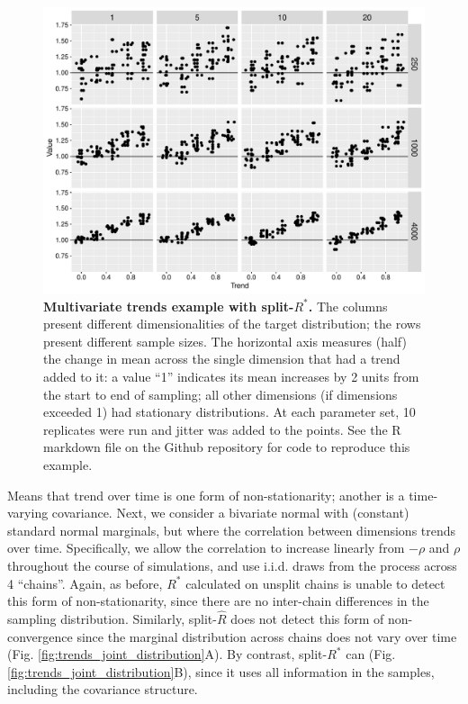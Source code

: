 \documentclass{article}
\begin{document}
\begin{figure}[!htb]
	\centerline{\includegraphics[width=1.0\textwidth]{../output/trends_one_dim.pdf}}
	\caption{\textbf{Multivariate trends example with split-$R^*$.} The columns present different dimensionalities of the target distribution; the rows present different sample sizes. The horizontal axis measures (half) the change in mean across the single dimension that had a trend added to it: a value ``1'' indicates its mean increases by 2 units from the start to end of sampling; all other dimensions (if dimensions exceeded 1) had stationary distributions. At each parameter set, 10 replicates were run and jitter was added to the points. See the R markdown file on the Github repository for code to reproduce this example.}
	\label{fig:trends_one_dim}
\end{figure}

Means that trend over time is one form of non-stationarity; another is a time-varying covariance. Next, we consider a bivariate normal with (constant) standard normal marginals, but where the correlation between dimensions trends over time. Specifically, we allow the correlation to increase linearly from $-\rho$ and $\rho$ throughout the course of simulations, and use i.i.d. draws from the process across 4 ``chains''. Again, as before, $R^*$ calculated on unsplit chains is unable to detect this form of non-stationarity, since there are no inter-chain differences in the sampling distribution. Similarly, split-$\widehat{R}$ does not detect this form of non-convergence since the marginal distribution across chains does not vary over time (Fig. \ref{fig:trends_joint_distribution}A). By contrast, split-$R^*$ can (Fig. \ref{fig:trends_joint_distribution}B), since it uses all information in the samples, including the covariance structure.
\end{document}
